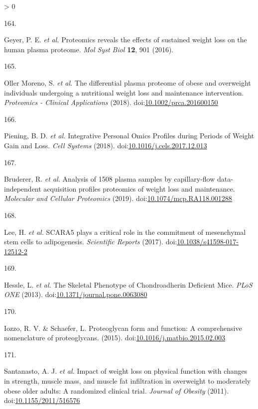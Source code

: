\documentclass[11pt,twoside]{bristolthesis}
\newlength{\cslhangindent}
\newlength{\csllabelwidth}
\newenvironment{CSLReferences}[2] %
 {%
  \setlength{\parindent}{0pt}
  \ifodd #1 \everypar{\setlength{\hangindent}{\cslhangindent}}\ignorespaces\fi
  \ifnum #2 > 0
  \setlength{\parskip}{#2\baselineskip}
  \fi
 }%
 {}
\newcommand{\CSLLeftMargin}[1]{\parbox[t]{\csllabelwidth}{#1}}
\newcommand{\CSLRightInline}[1]{\parbox[t]{\linewidth - \csllabelwidth}{#1}\break}
\begin{document}
\begin{CSLReferences}{0}{0}
\leavevmode\hypertarget{ref-Geyer2016}{}%
\CSLLeftMargin{164. }
\CSLRightInline{Geyer, P. E. \emph{et al.} {Proteomics reveals the effects of sustained weight loss on the human plasma proteome}. \emph{Mol Syst Biol} \textbf{12}, 901 (2016).}

\leavevmode\hypertarget{ref-OllerMoreno2018}{}%
\CSLLeftMargin{165. }
\CSLRightInline{Oller Moreno, S. \emph{et al.} {The differential plasma proteome of obese and overweight individuals undergoing a nutritional weight loss and maintenance intervention}. \emph{Proteomics - Clinical Applications} (2018). doi:\href{https://doi.org/10.1002/prca.201600150}{10.1002/prca.201600150}}

\leavevmode\hypertarget{ref-Piening2018}{}%
\CSLLeftMargin{166. }
\CSLRightInline{Piening, B. D. \emph{et al.} {Integrative Personal Omics Profiles during Periods of Weight Gain and Loss}. \emph{Cell Systems} (2018). doi:\href{https://doi.org/10.1016/j.cels.2017.12.013}{10.1016/j.cels.2017.12.013}}

\leavevmode\hypertarget{ref-Bruderer2019}{}%
\CSLLeftMargin{167. }
\CSLRightInline{Bruderer, R. \emph{et al.} {Analysis of 1508 plasma samples by capillary-flow data-independent acquisition profiles proteomics of weight loss and maintenance}. \emph{Molecular and Cellular Proteomics} (2019). doi:\href{https://doi.org/10.1074/mcp.RA118.001288}{10.1074/mcp.RA118.001288}}

\leavevmode\hypertarget{ref-Lee2017a}{}%
\CSLLeftMargin{168. }
\CSLRightInline{Lee, H. \emph{et al.} {SCARA5 plays a critical role in the commitment of mesenchymal stem cells to adipogenesis}. \emph{Scientific Reports} (2017). doi:\href{https://doi.org/10.1038/s41598-017-12512-2}{10.1038/s41598-017-12512-2}}

\leavevmode\hypertarget{ref-Hessle2013}{}%
\CSLLeftMargin{169. }
\CSLRightInline{Hessle, L. \emph{et al.} {The Skeletal Phenotype of Chondroadherin Deficient Mice}. \emph{PLoS ONE} (2013). doi:\href{https://doi.org/10.1371/journal.pone.0063080}{10.1371/journal.pone.0063080}}

\leavevmode\hypertarget{ref-Iozzo2015}{}%
\CSLLeftMargin{170. }
\CSLRightInline{Iozzo, R. V. \& Schaefer, L. {Proteoglycan form and function: A comprehensive nomenclature of proteoglycans}. (2015). doi:\href{https://doi.org/10.1016/j.matbio.2015.02.003}{10.1016/j.matbio.2015.02.003}}

\leavevmode\hypertarget{ref-Santanasto2011}{}%
\CSLLeftMargin{171. }
\CSLRightInline{Santanasto, A. J. \emph{et al.} {Impact of weight loss on physical function with changes in strength, muscle mass, and muscle fat infiltration in overweight to moderately obese older adults: A randomized clinical trial}. \emph{Journal of Obesity} (2011). doi:\href{https://doi.org/10.1155/2011/516576}{10.1155/2011/516576}}


\end{CSLReferences}
\end{document}
